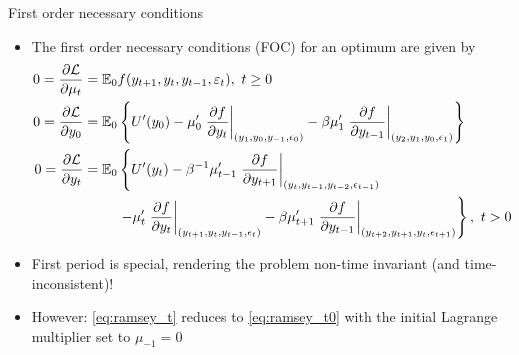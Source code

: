 \documentclass[handout,usepdftitle=false,xcolor=dvipsnames,aspectratio=169]{beamer}
\begin{document}
\begin{frame}{First order necessary conditions}
  \begin{itemize}
    \item The first order necessary conditions (FOC) for an optimum are given by
          \begin{align}
            0= \frac{\partial \mathcal{L}}{\partial \mu_t} = \mathbb{E}_0 & f(y_{t+1}, y_{t}, y_{t-1}, \varepsilon_{t}),~t\geq 0                                                                                                                                                                                                                                      \\
            0=\frac{\partial \mathcal{L}}{\partial y_0} = \mathbb{E}_0    & \left\{ U' (y_0) - \mu_0 ' \left. \frac{\partial f}{\partial y_t} \right|_{\left( y_1, y_0, y_{-1}, \epsilon_0 \right)} - \beta \mu_1 ' \left. \frac{\partial f}{\partial y_{t-1}} \right|_{ \left( y_2, y_1, y_{0}, \epsilon_1 \right) } \right\}                   \label{eq:ramsey_t0}
            \\
            0=\frac{\partial \mathcal{L}}{\partial y_t} = \mathbb{E}_0    & \left\{ U' (y_t) - \beta^{-1}\mu_{t-1} ' \left. \frac{\partial f}{\partial y_{t+1}} \right|_{\left( y_{t}, y_{t-1}, y_{t-2}, \epsilon_{t-1} \right)}\right.     \notag
            \\
                                                                          & \left. - \mu_t' \left. \frac{\partial f}{\partial y_{t}} \right|_{\left( y_{t+1}, y_{t}, y_{t-1}, \epsilon_{t} \right)} - \beta \mu_{t+1}' \left. \frac{\partial f}{\partial y_{t-1}} \right|_{\left( y_{t+2}, y_{t+1}, y_{t}, \epsilon_{t+1} \right)} \right\},~t>0 \label{eq:ramsey_t}
          \end{align}
    \item First period is special, rendering the problem non-time invariant (and time-inconsistent)!
    \item However: \eqref{eq:ramsey_t} reduces to \eqref{eq:ramsey_t0} with the initial Lagrange multiplier set to $\mu_{-1}=0$
  \end{itemize}

\end{frame}
\end{document}
